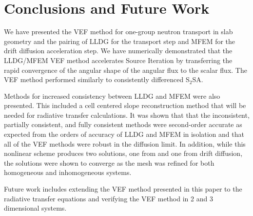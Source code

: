 
\section{Conclusions and Future Work}
We have presented the VEF method for one-group neutron transport in slab geometry and the pairing of LLDG for the \SN transport step and MFEM for the drift diffusion acceleration step. We have numerically demonstrated that the LLDG/MFEM VEF method accelerates Source Iteration by transferring the rapid convergence of the angular shape of the angular flux to the scalar flux. The VEF method performed similarly to consistently differenced S$_2$SA. 

Methods for increased consistency between LLDG and MFEM were also presented. This included a cell centered slope reconstruction method that will be needed for radiative transfer calculations. It was shown that that the inconsistent, partially consistent, and fully consistent methods were second-order accurate as expected from the orders of accuracy of LLDG and MFEM in isolation and that all of the VEF methods were robust in the diffusion limit. In addition, while this nonlinear scheme produces two solutions, one from \SN and one from drift diffusion, the solutions were shown to converge as the mesh was refined for both homogeneous and inhomogeneous systems. 

Future work includes extending the VEF method presented in this paper to the radiative transfer equations and verifying the VEF method in 2 and 3 dimensional systems. 